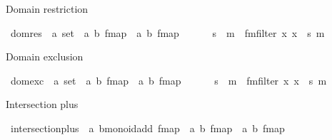 \begin{isabellebody}
\begin{isamarkuptext}%
Domain restriction%
\end{isamarkuptext}\isamarkuptrue%
\isamarkupfalse%
\ dom{\isacharunderscore}{\kern0pt}res\ {\isacharcolon}{\kern0pt}{\isacharcolon}{\kern0pt}\ {\isachardoublequoteopen}{\isacharprime}{\kern0pt}a\ set\ {\isasymRightarrow}\ {\isacharparenleft}{\kern0pt}{\isacharprime}{\kern0pt}a{\isacharcomma}{\kern0pt}\ {\isacharprime}{\kern0pt}b{\isacharparenright}{\kern0pt}\ fmap\ {\isasymRightarrow}\ {\isacharparenleft}{\kern0pt}{\isacharprime}{\kern0pt}a{\isacharcomma}{\kern0pt}\ {\isacharprime}{\kern0pt}b{\isacharparenright}{\kern0pt}\ fmap{\isachardoublequoteclose}\ {\isacharparenleft}{\kern0pt}\ {\isacartoucheopen}{\isasymlhd}{\isacartoucheclose}\ {}{}{}{\isacharparenright}{\kern0pt}\ \isanewline
\ \ {\isachardoublequoteopen}s\ {\isasymlhd}\ m\ {\isasymequiv}\ fmfilter\ {\isacharparenleft}{\kern0pt}{\isasymlambda}x{\isachardot}{\kern0pt}\ x\ {\isasymin}\ s{\isacharparenright}{\kern0pt}\ m{\isachardoublequoteclose}%
\begin{isamarkuptext}%
Domain exclusion%
\end{isamarkuptext}\isamarkuptrue%
\isamarkupfalse%
\ dom{\isacharunderscore}{\kern0pt}exc\ {\isacharcolon}{\kern0pt}{\isacharcolon}{\kern0pt}\ {\isachardoublequoteopen}{\isacharprime}{\kern0pt}a\ set\ {\isasymRightarrow}\ {\isacharparenleft}{\kern0pt}{\isacharprime}{\kern0pt}a{\isacharcomma}{\kern0pt}\ {\isacharprime}{\kern0pt}b{\isacharparenright}{\kern0pt}\ fmap\ {\isasymRightarrow}\ {\isacharparenleft}{\kern0pt}{\isacharprime}{\kern0pt}a{\isacharcomma}{\kern0pt}\ {\isacharprime}{\kern0pt}b{\isacharparenright}{\kern0pt}\ fmap{\isachardoublequoteclose}\ {\isacharparenleft}{\kern0pt}\ {\isacartoucheopen}{\isasymlhd}{\isacharprime}{\kern0pt}{\isacharslash}{\kern0pt}{\isacartoucheclose}\ {}{}{}{\isacharparenright}{\kern0pt}\ \isanewline
\ \ {\isachardoublequoteopen}s\ {\isasymlhd}{\isacharslash}{\kern0pt}\ m\ {\isasymequiv}\ fmfilter\ {\isacharparenleft}{\kern0pt}{\isasymlambda}x{\isachardot}{\kern0pt}\ x\ {\isasymnotin}\ s{\isacharparenright}{\kern0pt}\ m{\isachardoublequoteclose}%
\begin{isamarkuptext}%
Intersection plus%
\end{isamarkuptext}\isamarkuptrue%
\isamarkupfalse%
\ intersection{\isacharunderscore}{\kern0pt}plus\ {\isacharcolon}{\kern0pt}{\isacharcolon}{\kern0pt}\ {\isachardoublequoteopen}{\isacharparenleft}{\kern0pt}{\isacharprime}{\kern0pt}a{\isacharcomma}{\kern0pt}\ {\isacharprime}{\kern0pt}b{\isacharcolon}{\kern0pt}{\isacharcolon}{\kern0pt}monoid{\isacharunderscore}{\kern0pt}add{\isacharparenright}{\kern0pt}\ fmap\ {\isasymRightarrow}\ {\isacharparenleft}{\kern0pt}{\isacharprime}{\kern0pt}a{\isacharcomma}{\kern0pt}\ {\isacharprime}{\kern0pt}b{\isacharparenright}{\kern0pt}\ fmap\ {\isasymRightarrow}\ {\isacharparenleft}{\kern0pt}{\isacharprime}{\kern0pt}a{\isacharcomma}{\kern0pt}\ {\isacharprime}{\kern0pt}b{\isacharparenright}{\kern0pt}\ fmap{\isachardoublequoteclose}\isanewline

\end{isabellebody}
